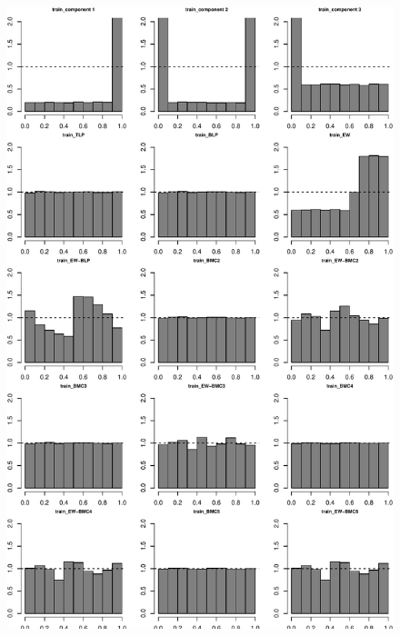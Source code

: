 \documentclass[
]{article}
\begin{document}
\begin{figure}[h]

{\centering \includegraphics{applied_blp_sim_files/figure-latex/unnamed-chunk-13-1} 

}

\end{figure}

\clearpage
\end{document}
